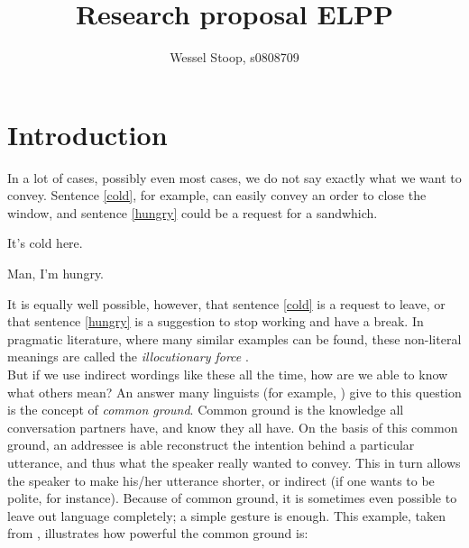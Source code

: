 \documentclass[12pt]{article}
\title{Research proposal ELPP}
\author{Wessel Stoop, s0808709}
\let\stdsection\section
\renewcommand\section{\newpage\stdsection}
\begin{document}
\maketitle

\section{Introduction}
In a lot of cases, possibly even most cases, we do not say exactly what we want to convey. Sentence \ref{cold}, for example, can easily convey an order to close the window, and sentence \ref{hungry} could be a request for a sandwhich.

\begin{examples}
\item It's cold here. \label{cold}
\item Man, I'm hungry. \label{hungry}
\end{examples}

It is equally well possible, however, that sentence \ref{cold} is a request to leave, or that sentence \ref{hungry} is a suggestion to stop working and have a break. In pragmatic literature, where many similar examples can be found, these non-literal meanings are called the \emph{illocutionary force} \citep{a75}. \\\indent
But if we use indirect wordings like these all the time, how are we able to know what others mean? An answer many linguists (for example, \citet{c96,t08}) give to this question is the concept of \emph{common ground}. Common ground is the knowledge all conversation partners have, and know they all have. On the basis of this common ground, an addressee is able reconstruct the intention behind a particular utterance, and thus what the speaker really wanted to convey. This in turn allows the speaker to make his/her utterance shorter, or indirect (if one wants to be polite, for instance). Because of common ground, it is sometimes even possible to leave out language completely; a simple gesture is enough. This example, taken from \citet[pp. 3-5]{t08}, illustrates how powerful the common ground is:
\end{document}
